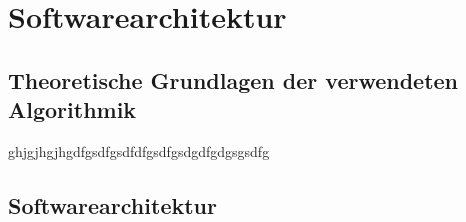\chapter{Softwarearchitektur}
\label{cha:Softwarearchitektur}

\section{Theoretische Grundlagen der verwendeten Algorithmik}

ghjgjhgjhgdfgsdfgsdfdfgsdfgsdgdfgdgsgsdfg

\section{Softwarearchitektur}

